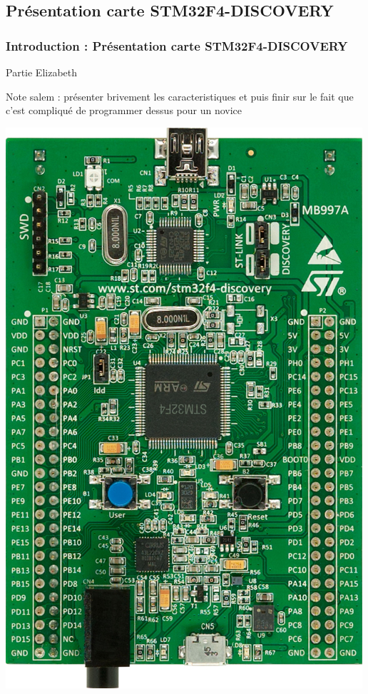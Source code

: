 \documentclass{beamer}
\begin{document}
\subsection{Présentation carte STM32F4-DISCOVERY}
\begin{frame}
\frametitle{Introduction : Présentation carte STM32F4-DISCOVERY}
Partie Elizabeth

Note salem : présenter brivement les caracteristiques et puis finir sur le fait que
c'est compliqué de programmer dessus pour un novice
\begin{center}
 \includegraphics[scale=0.1]{../images/stm32f4_discovery.jpg}
\end{center}
\end{frame}
\end{document}
